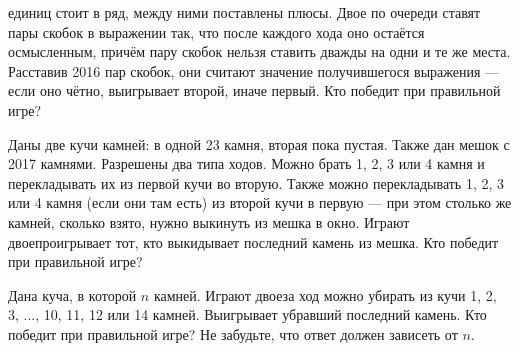 ﻿
\begin{itemize}

 единиц стоит в ряд, между ними поставлены плюсы. Двое по очереди ставят пары скобок в выражении так, что после каждого хода оно остаётся осмысленным, причём пару скобок нельзя ставить дважды на одни и те же места. Расставив 2016 пар скобок, они считают значение получившегося выражения — если оно чётно, выигрывает второй, иначе первый. Кто победит при правильной игре?

\itB Даны две кучи камней: в одной 23 камня, вторая пока пустая. Также дан мешок с 2017 камнями. Разрешены два типа ходов. Можно брать 1, 2, 3 или 4 камня и перекладывать их из первой кучи во вторую. Также можно перекладывать 1, 2, 3 или 4 камня (если они там есть) из второй кучи в первую — при этом столько же камней, сколько взято, нужно выкинуть из мешка в окно. Играют двое\scolon проигрывает тот, кто выкидывает последний камень из мешка. Кто победит при правильной игре?

\itC Дана куча, в которой $n$ камней. Играют двое\scolon за ход можно убирать из кучи 1, 2, 3, ..., 10, 11, 12 или 14 камней. Выигрывает убравший последний камень. Кто победит при правильной игре? Не забудьте, что ответ должен зависеть от $n$.
\end{itemize}